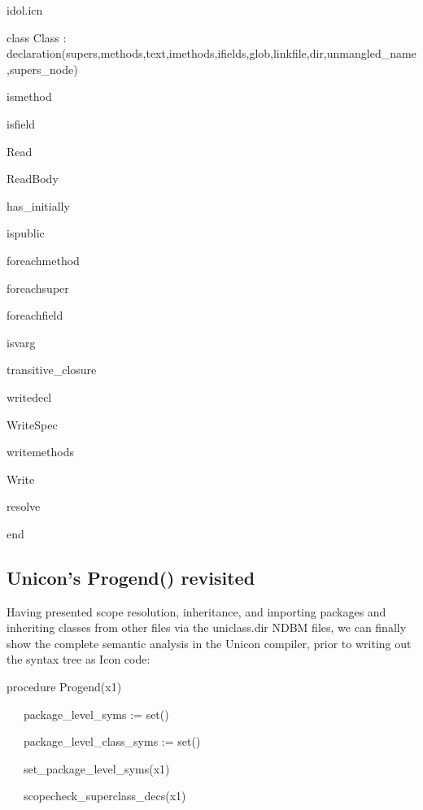 {\ttfamily\mdseries
idol.icn}

{\ttfamily\mdseries
class Class : declaration(supers,methods,text,imethods,ifields,glob,linkfile,dir,unmangled\_name,supers\_node)}

{\ttfamily\mdseries
ismethod}

{\ttfamily\mdseries
isfield}

{\ttfamily\mdseries
Read}

{\ttfamily\mdseries
ReadBody}

{\ttfamily\mdseries
has\_initially}

{\ttfamily\mdseries
ispublic}

{\ttfamily\mdseries
foreachmethod}

{\ttfamily\mdseries
foreachsuper}

{\ttfamily\mdseries
foreachfield}

{\ttfamily\mdseries
isvarg}

{\ttfamily\mdseries
transitive\_closure}

{\ttfamily\mdseries
writedecl}

{\ttfamily\mdseries
WriteSpec}

{\ttfamily\mdseries
writemethods}

{\ttfamily\mdseries
Write}

{\ttfamily\mdseries
resolve}

{\ttfamily\mdseries
end}

\subsection{Unicon's Progend() revisited }

Having presented scope resolution, inheritance, and importing packages
and inheriting classes from other files via the uniclass.dir NDBM
files, we can finally show the complete semantic analysis in the
Unicon compiler, prior to writing out the syntax tree as Icon code:

{\ttfamily\mdseries
procedure Progend(x1)}


\bigskip

{\ttfamily\mdseries
\ \ \ package\_level\_syms := set()}

{\ttfamily\mdseries
\ \ \ package\_level\_class\_syms := set()}

{\ttfamily\mdseries
\ \ \ set\_package\_level\_syms(x1)}

{\ttfamily\mdseries
\ \ \ scopecheck\_superclass\_decs(x1)}


\bigskip

